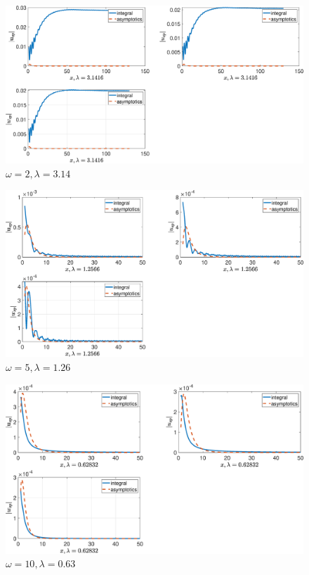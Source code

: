 \begin{figure}[!h]\centering\includegraphics[scale=0.38]{uspw2cp(1)2cp(2)1cs(1)0,5cs(20,3rho(1)2rho(2)1.eps}\caption{$ \omega = 2, \lambda = 3.14$}\end{figure}

\begin{figure}[!h]\centering\includegraphics[scale=0.38]{uspw5cp(1)2cp(2)1cs(1)0,5cs(20,3rho(1)2rho(2)1.eps}\caption{$ \omega = 5, \lambda = 1.26$}\end{figure}

\begin{figure}[!h]\centering\includegraphics[scale=0.38]{uspw10cp(1)2cp(2)1cs(1)0,5cs(20,3rho(1)2rho(2)1.eps}\caption{$ \omega = 10, \lambda = 0.63$}\end{figure}

